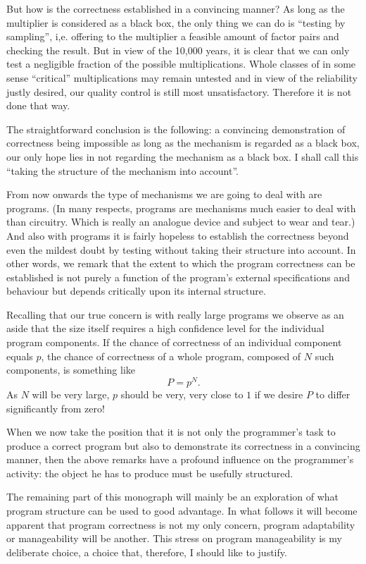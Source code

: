 But how is the correctness established in a convincing manner? As long as
the multiplier is considered as a black box, the only thing we can do is
``testing by sampling'', i,e. offering to the multiplier a feasible amount
of factor pairs and checking the result. But in view of the 10,000 years,
it is clear that we can only test a negligible fraction of the possible
multiplications. Whole classes of in some sense ``critical''
multiplications may remain untested and in view of the reliability justly
desired, our quality control is still most unsatisfactory. Therefore
it is not done that way.

The straightforward conclusion is the following: a convincing demonstration
of correctness being impossible as long as the mechanism is regarded as a
black box, our only hope lies in not regarding the mechanism as a black box.
I shall call this ``taking the structure of the mechanism into account''.

From now onwards the type of mechanisms we are going to deal with are programs.
(In many respects, programs are mechanisms much easier to deal with than
circuitry. Which is really an analogue device and subject to wear and tear.)
And also with programs it is fairly hopeless to establish the correctness
beyond even the mildest doubt by testing without taking their structure into
account. In other words, we remark that the extent to which the program
correctness can be established is not purely a function of the program's
external specifications and behaviour but depends critically upon its internal
structure.

Recalling that our true concern is with really large programs  we observe as
an aside that the size itself requires a high confidence level for the
individual program components. If the chance of correctness of an individual
component equals $p$, the chance of correctness of a whole program, composed of
$N$ such components, is something like \[P = p^N.\] As $N$ will be very large,
$p$ should be very, very close to $1$ if we desire $P$ to differ significantly
from zero!

When we now take the position that it is not only the programmer's task to
produce a correct program but also to demonstrate its correctness in a
convincing manner, then the above remarks have a profound influence on the
programmer's activity: the object he has to produce must be usefully structured.

The remaining part of this monograph will mainly be an exploration of what
program structure can be used to good advantage. In what follows it will become
apparent that program correctness is not my only concern, program adaptability
or manageability will be another. This stress on program manageability is my
deliberate choice, a choice that, therefore, I should like to justify.

